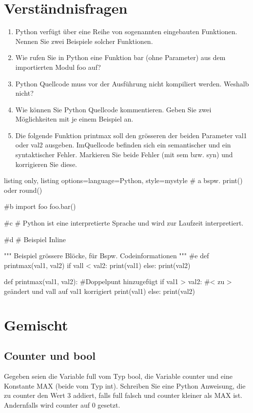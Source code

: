 \documentclass[11pt, oneside]{book}
\begin{document}
\section{Verständnisfragen}
\begin{enumerate}
    \item Python verf\"ugt \"uber eine Reihe von sogenannten eingebauten Funktionen. Nennen Sie zwei Beispiele solcher Funktionen.
    \item Wie rufen Sie in Python eine Funktion bar (ohne Parameter) aus dem importierten Modul foo auf?
    \item Python Quellcode muss vor der Ausf\"uhrung nicht kompiliert werden. Weshalb nicht?
    \item Wie können Sie Python Quellcode kommentieren. Geben Sie zwei Möglichkeiten mit je einem Beispiel an.
    \item Die folgende Funktion printmax soll den grösseren der beiden Parameter val1 oder val2 ausgeben. ImQuellcode befinden sich ein semantischer und ein syntaktischer Fehler. Markieren Sie beide Fehler (mit sem bzw. syn) und korrigieren Sie diese.
\end{enumerate}

\begin{tcblisting}{listing only, listing options={language=Python, style=mystyle}}
# a bspw. print() oder round()

#b 
import foo
foo.bar()

#c
# Python ist eine interpretierte Sprache und wird zur Laufzeit interpretiert.

#d
# Beispiel Inline

"""
Beispiel grössere Blöcke, für Bspw. Codeinformationen
"""
#e
def printmax(val1, val2)
    if vall < val2:
        print(val1)
    else:
        print(val2)

def printmax(val1, val2): #Doppelpunt hinzugefügt
    if val1 > val2: #< zu > geändert und vall auf val1 korrigiert
        print(val1)
    else:
        print(val2)
\end{tcblisting}

\newpage
\section{Gemischt}
\subsection{Counter und bool}
Gegeben seien die Variable full vom Typ bool, die Variable counter und eine Konstante MAX (beide vom Typ int). Schreiben Sie eine Python Anweisung, die zu counter den Wert 3 addiert, falls full falsch und counter kleiner als MAX ist. Andernfalls wird counter auf 0 gesetzt.
\end{document}
